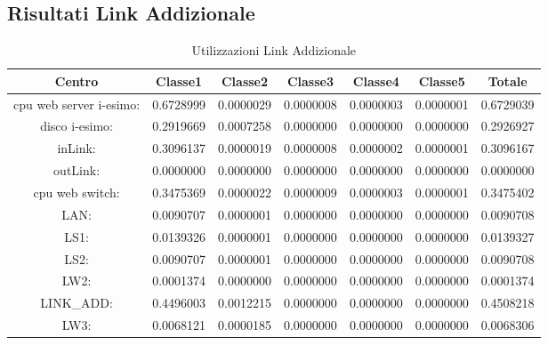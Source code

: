 \subsection{Risultati Link Addizionale}
\begin{table}[H]
\begin{center}\begin{scriptsize}
\begin{tabular}{||c|c|c|c|c|c|c||}
\hline
Centro &Classe1 &Classe2 &Classe3 &Classe4 &Classe5 &Totale\\
\hline
\hline
 cpu web server i-esimo: 	&0.6728999	&0.0000029	&0.0000008	&0.0000003	&0.0000001	&0.6729039\\
\hline
 disco i-esimo: 	&0.2919669	&0.0007258	&0.0000000	&0.0000000	&0.0000000	&0.2926927\\
\hline
 inLink: 	&0.3096137	&0.0000019	&0.0000008	&0.0000002	&0.0000001	&0.3096167\\
\hline
 outLink: 	&0.0000000	&0.0000000	&0.0000000	&0.0000000	&0.0000000	&0.0000000\\
\hline
 cpu web switch: 	&0.3475369	&0.0000022	&0.0000009	&0.0000003	&0.0000001	&0.3475402\\
\hline
 LAN: 	&0.0090707	&0.0000001	&0.0000000	&0.0000000	&0.0000000	&0.0090708\\
\hline
 LS1: 	&0.0139326	&0.0000001	&0.0000000	&0.0000000	&0.0000000	&0.0139327\\
\hline
 LS2:	&0.0090707	&0.0000001	&0.0000000	&0.0000000	&0.0000000	&0.0090708\\
\hline
 LW2: 	&0.0001374	&0.0000000	&0.0000000	&0.0000000	&0.0000000	&0.0001374\\
\hline
 LINK\_ADD: 	&0.4496003	&0.0012215	&0.0000000	&0.0000000	&0.0000000	&0.4508218\\
\hline
 LW3: 	&0.0068121	&0.0000185	&0.0000000	&0.0000000	&0.0000000	&0.0068306\\
\hline
\end{tabular}
\end{scriptsize}\end{center}
\caption{Utilizzazioni Link Addizionale}
\label{utilizzazioni}
\end{table}

